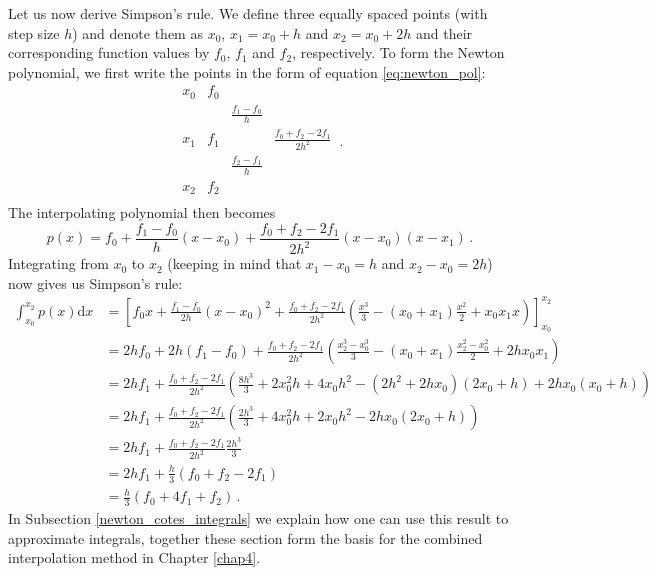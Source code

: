 Let us now derive Simpson's rule. We define three equally spaced points (with step size $h$) and denote them as $x_0$, $x_1=x_0+h$ and $x_2=x_0+2h$ and their corresponding function values by $f_0$, $f_1$ and $f_2$, respectively. To form the Newton polynomial, we first write the points in the form of equation \ref{eq:newton_pol}:
\begin{equation}
    \begin{matrix}
        x_0 & f_0 \\
            & & \frac{f_1-f_0}{h} \\
        x_1 & f_1 & & \frac{f_0 + f_2-2f_1}{2h^2} \\
            & & \frac{f_2-f_1}{h} \\
        x_2 & f_2 \\
    \end{matrix} \,.\nonumber
\end{equation}
The interpolating polynomial then becomes
\begin{equation}
    p(x) = f_0 + \frac{f_1-f_0}{h} (x-x_0) + \frac{f_0 + f_2-2f_1}{2h^2} (x-x_0)(x-x_1) \,.\nonumber
\end{equation}
Integrating from $x_0$ to $x_2$ (keeping in mind that $x_1-x_0 = h$ and $x_2-x_0 = 2h$) now gives us Simpson's rule:
\begin{align}
    \int_{x_0}^{x_2} p(x) \mathrm dx &= \left[f_0 x + \frac{f_1-f_0}{2h} (x-x_0)^2 + \frac{f_0 + f_2-2f_1}{2h^2} \left(\frac{x^3}{3}-(x_0+x_1)\frac{x^2}{2} + x_0 x_1 x\right)\right]_{x_0}^{x_2} \nonumber \\
                                     &= 2hf_0 + 2h(f_1-f_0) + \frac{f_0 + f_2-2f_1}{2h^2} \left(\frac{x_2^3-x_0^3}{3}-(x_0+x_1)\frac{x_2^2-x_0^2}{2} + 2h x_0 x_1 \right) \nonumber \\
                                     &= 2hf_1 + \frac{f_0 + f_2-2f_1}{2h^2} \left(\frac{8h^3}{3}+2x_0^2h+4x_0h^2-(2h^2+2hx_0)(2x_0+h) + 2h x_0 (x_0+h) \right) \nonumber \\
                                     &= 2hf_1 + \frac{f_0 + f_2-2f_1}{2h^2} \left(\frac{2h^3}{3}+4x_0^2h+2x_0h^2-2hx_0(2x_0+h)  \right) \nonumber \\
                                     &= 2hf_1 + \frac{f_0 + f_2-2f_1}{2h^2} \frac{2h^3}{3} \nonumber \\
                                     &= 2hf_1 + \frac{h}{3}(f_0 + f_2-2f_1) \nonumber \\
                                     &= \frac{h}{3}(f_0 + 4f_1 + f_2) \,.\nonumber
\end{align}
In Subsection \ref{newton_cotes_integrals} we explain how one can use this result to approximate integrals, together these section form the basis for the combined interpolation method in Chapter \ref{chap4}.

